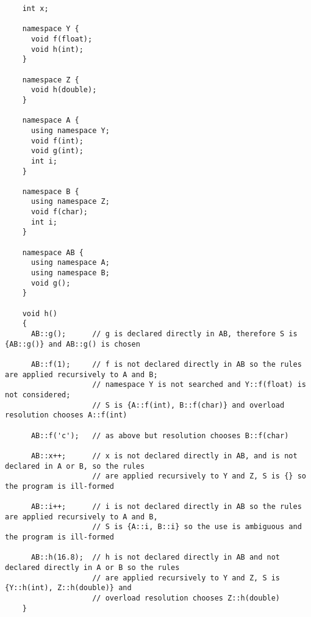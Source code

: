 \begin{example}
  \begin{lstlisting}
    int x;

    namespace Y {
      void f(float);
      void h(int);
    }

    namespace Z {
      void h(double);
    }

    namespace A {
      using namespace Y;
      void f(int);
      void g(int);
      int i;
    }

    namespace B {
      using namespace Z;
      void f(char);
      int i;
    }

    namespace AB {
      using namespace A;
      using namespace B;
      void g();
    }

    void h()
    {
      AB::g();      // g is declared directly in AB, therefore S is {AB::g()} and AB::g() is chosen

      AB::f(1);     // f is not declared directly in AB so the rules are applied recursively to A and B;
                    // namespace Y is not searched and Y::f(float) is not considered;
                    // S is {A::f(int), B::f(char)} and overload resolution chooses A::f(int)

      AB::f('c');   // as above but resolution chooses B::f(char)

      AB::x++;      // x is not declared directly in AB, and is not declared in A or B, so the rules
                    // are applied recursively to Y and Z, S is {} so the program is ill-formed

      AB::i++;      // i is not declared directly in AB so the rules are applied recursively to A and B,
                    // S is {A::i, B::i} so the use is ambiguous and the program is ill-formed

      AB::h(16.8);  // h is not declared directly in AB and not declared directly in A or B so the rules
                    // are applied recursively to Y and Z, S is {Y::h(int), Z::h(double)} and
                    // overload resolution chooses Z::h(double)
    }
  \end{lstlisting}
\end{example}

